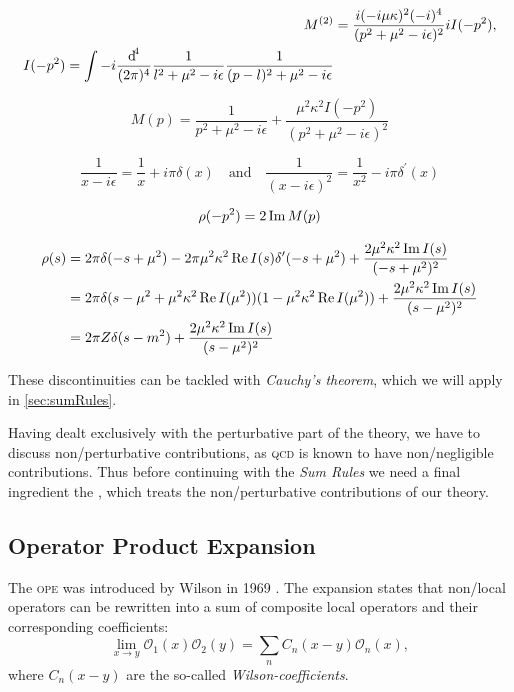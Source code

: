 \documentclass[../../index.tex]{subfiles}
\begin{document}
\begin{equation}
  \begin{split}
    M^{(2)} &= \frac{i (-i \mu \kappa)^2(-i)^4}{(p^2 + \mu^2 - i\epsilon)^2} i I(-p^2), \\
    I(-p^2) = \int - i \frac{\dif^4}{(2\pi)^4} \frac{1}{l^2 + \mu^2 - i\epsilon} \frac{1}{(p-l)^2 + \mu^2 -i \epsilon}
  \end{split}
\end{equation}

\begin{equation}
  M(p) = \frac{1}{p^2 + \mu^2 - i\epsilon} + \frac{\mu^2 \kappa^2 I(-p^2)}{(p^2 + \mu^2 -i \epsilon)^2}
\end{equation}

\begin{equation}
  \frac{1}{x-i\epsilon} = \frac{1}{x} + i \pi \delta(x) \quad \text{and} \quad \frac{1}{(x-i\epsilon)^2} = \frac{1}{x^2} - i \pi \delta^\prime(x)
\end{equation}

\begin{equation}
  \rho(-p^2) = 2 \operatorname{Im} M(p)
\end{equation}

\begin{equation}
  \begin{split}
    \rho(s) &= 2 \pi \delta(-s + \mu^2) - 2\pi \mu^2 \kappa^2 \operatorname{Re} I(s) \delta^\prime(-s + \mu^2) + \frac{2\mu^2 \kappa^2 \operatorname{Im} I(s)}{(-s +\mu^2)^2} \\
    &= 2 \pi \delta(s-\mu^2 + \mu^2 \kappa^2 \operatorname{Re} I(\mu^2))(1 -\mu^2 \kappa^2 \operatorname{Re} I(\mu^2)) + \frac{2 \mu^2 \kappa^2 \operatorname{Im} I(s)}{(s-\mu^2)^2} \\
    &= 2 \pi Z \delta(s-m^2) + \frac{2\mu^2 \kappa^2 \operatorname{Im} I(s)}{(s-\mu^2)^2}
  \end{split}
\end{equation}


These discontinuities can be tackled with \textit{Cauchy's theorem}, which we
will apply in \cref{sec:sumRules}.

Having dealt exclusively with the perturbative part of the theory, we have to
discuss non\-/perturbative contributions, as \textsc{qcd} is known to have
non\-/negligible contributions. Thus before continuing with the \textit{Sum
  Rules} we need a final ingredient the , which treats the non\-/perturbative contributions of our theory.


\subsection{Operator Product Expansion}
The \textsc{ope} was introduced by Wilson in 1969 \cite{Wilson1969}. The
expansion states that non\-/local operators can be rewritten into a sum of
composite local operators and their corresponding coefficients:
\begin{equation}
  \label{eq:ope}
  \lim_{x\to y} \mathcal{O}_1(x) \mathcal{O}_2(y) = \sum_n C_n(x-y)\mathcal{O}_n(x),
\end{equation}
where $C_n(x-y)$ are the so-called \textit{Wilson-coefficients}.
\end{document}
